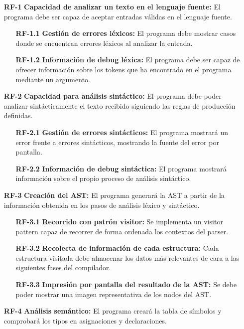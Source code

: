 \begin{enumerate}
\item[\textbf{RF-1}] \textbf{Capacidad de analizar un texto en el lenguaje fuente:} El programa debe ser capaz de aceptar entradas válidas en el lenguaje fuente.
	\begin{enumerate}
		\item[\textbf{RF-1.1}] \textbf{Gestión de errores léxicos:} El programa debe mostrar casos donde se encuentran errores léxicos al analizar la entrada.
		\item[\textbf{RF-1.2}] \textbf{Información de debug léxica:} El programa debe ser capaz de ofrecer información sobre los tokens que ha encontrado en el programa mediante un argumento.
	\end{enumerate}
\item[\textbf{RF-2}] \textbf{Capacidad para análisis sintáctico:} El programa debe poder analizar sintácticamente el texto recibido siguiendo las reglas de producción definidas.
	\begin{enumerate}
		\item[\textbf{RF-2.1}] \textbf{Gestión de errores sintácticos:} El programa mostrará un error frente a errores sintácticos, mostrando la fuente del error por pantalla.
		\item[\textbf{RF-2.2}] \textbf{Información de debug sintáctica:} El programa mostrará información sobre el propio proceso de análisis sintáctico.
	\end{enumerate}
\item[\textbf{RF-3}] \textbf{Creación del AST:} El programa generará la AST a partir de la información obtenida en los pasos de análisis léxico y sintáctico.
	\begin{enumerate}	
		\item[\textbf{RF-3.1}] \textbf{Recorrido con patrón visitor:} Se implementa un visitor pattern capaz de recorrer de forma ordenada los contextos del parser.
		\item[\textbf{RF-3.2}] \textbf{Recolecta de información de cada estructura:} Cada estructura visitada debe almacenar los datos más relevantes de cara a las siguientes fases del compilador. 
		\item[\textbf{RF-3.3}] \textbf{Impresión por pantalla del resultado de la AST:} Se debe poder mostrar una imagen representativa de los nodos del AST.
	\end{enumerate}	
\item[\textbf{RF-4}] \textbf{Análisis semántico:} El programa creará la tabla de símbolos y comprobará los tipos en asignaciones y declaraciones.

\end{enumerate}
